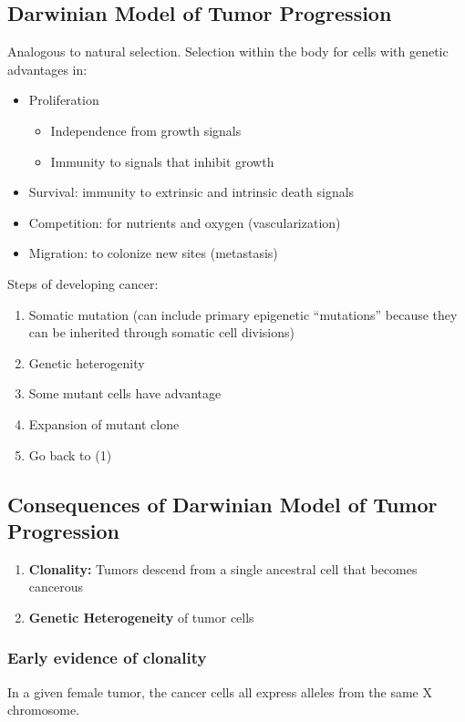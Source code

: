 \documentclass[10pt]{article}
\begin{document}
\subsection*{Darwinian Model of Tumor Progression}
Analogous to natural selection.  Selection within the body for cells with genetic advantages in:
\begin{itemize}
	\item Proliferation
	\begin{itemize}
        \item Independence from growth signals
        \item Immunity to signals that inhibit growth
    \end{itemize}
    \item Survival: immunity to extrinsic and intrinsic death signals
    \item Competition: for nutrients and oxygen (vascularization)
    \item Migration: to colonize new sites (metastasis)
\end{itemize}
Steps of developing cancer:
\begin{enumerate}
	\item Somatic mutation (can include primary epigenetic ``mutations'' because they can be inherited through somatic cell divisions)
	\item Genetic heterogenity
	\item Some mutant cells have advantage
	\item Expansion of mutant clone
	\item Go back to (1)
\end{enumerate}

\subsection*{Consequences of Darwinian Model of Tumor Progression}
\begin{enumerate}
	\item \textbf{Clonality:} Tumors descend from a single ancestral cell that becomes cancerous
	\item \textbf{Genetic Heterogeneity} of tumor cells
\end{enumerate}

\subsubsection*{Early evidence of clonality}
In a given female tumor, the cancer cells all express alleles from the same X chromosome.
\end{document}
